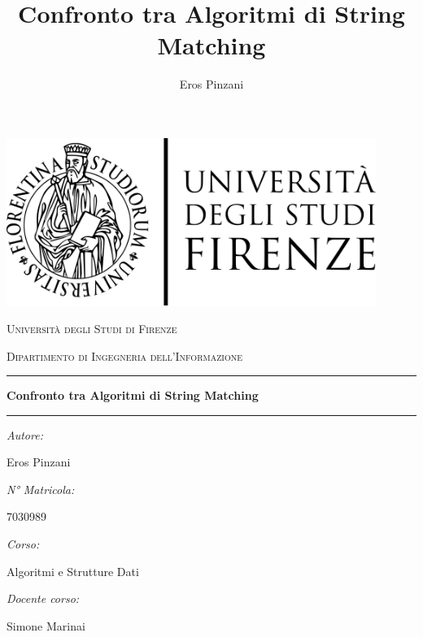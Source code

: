 \documentclass{article}
\title{Confronto tra Algoritmi di String Matching}
\author{Eros Pinzani}
\begin{document}
\pagestyle{fancy}

\begin{titlepage}
    \centering
    \includegraphics[width=0.90\textwidth]{img/Logo_universita_firenze.svg.png}\par\vspace{1cm}
    {\scshape\LARGE Università degli Studi di Firenze \par}
    \vspace{0.25cm}
    {\scshape\Large Dipartimento di Ingegneria dell'Informazione\par}
    \vspace{0.5cm}
    \rule{\linewidth}{0.4pt}
    \begin{center}
        {\Huge{\bfseries \textbf{Confronto tra Algoritmi di String Matching}\par}}
    \end{center}
    \rule{\linewidth}{0.4pt}
    \vspace{1cm}

    \begin{minipage}[t]{0.4\textwidth}
        \begin{flushleft} \large
            \emph{Autore:}\par
            Eros Pinzani\par
        \end{flushleft}

        \begin{flushleft} \large
            \emph{N° Matricola:}\par
            7030989\par
        \end{flushleft}
    \end{minipage}
    \hfill
    \begin{minipage}[t]{0.4\textwidth}
        \begin{flushleft} \large\raggedleft
            \emph{Corso:}\par
            Algoritmi e Strutture Dati
        \end{flushleft}

        \begin{flushleft} \large\raggedleft
            \emph{Docente corso:}\par
            Simone Marinai\par
        \end{flushleft}
    \end{minipage}

\end{titlepage}
\end{document}
